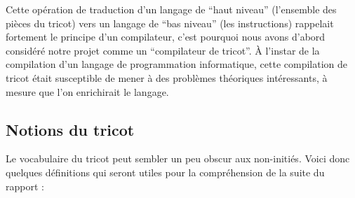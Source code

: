 \documentclass{article}
\begin{document}
Cette opération de traduction d'un langage de ``haut niveau''
(l'ensemble des pièces du tricot) vers un langage de ``bas niveau''
(les instructions) rappelait fortement le principe d'un compilateur,
c'est pourquoi nous avons d'abord considéré notre projet comme un
``compilateur de tricot''. À l'instar de la compilation d'un langage
de programmation informatique, cette compilation de tricot était
susceptible de mener à des problèmes théoriques intéressants, à mesure
que l'on enrichirait le langage.

\subsection*{Notions du tricot} %


Le vocabulaire du tricot peut sembler un peu obscur aux non-initiés.
Voici donc quelques définitions qui seront utiles pour la compréhension
de la suite du rapport :
\end{document}
